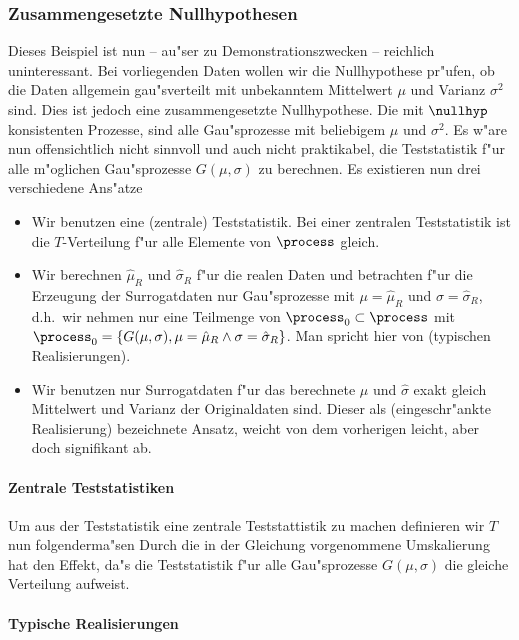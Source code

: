 \subsubsection{Zusammengesetzte Nullhypothesen}
Dieses Beispiel ist nun -- au"ser zu Demonstrationszwecken -- reichlich uninteressant. Bei
vorliegenden Daten wollen wir die Nullhypothese pr"ufen, ob die Daten allgemein
gau"sverteilt mit unbekanntem Mittelwert $\mu$ und Varianz $\sigma^2$ sind. Dies ist
jedoch eine zusammengesetzte Nullhypothese. Die mit $\nullhyp$ konsistenten Prozesse, sind
alle Gau"sprozesse mit beliebigem $\mu$ und $\sigma^2$. Es w"are nun offensichtlich nicht
sinnvoll und auch nicht praktikabel, die Teststatistik  f"ur alle
m"oglichen Gau"sprozesse $G(\mu,\sigma)$ zu berechnen. Es existieren nun drei verschiedene
Ans"atze
\begin{itemize}
\item Wir benutzen eine \begriff(zentrale) Teststatistik. Bei einer zentralen
  Teststatistik ist die $T$-Verteilung f"ur alle Elemente von $\process$ gleich.
\item Wir berechnen $\hat\mu_R$ und $\hat\sigma_R$ f"ur die realen Daten und betrachten f"ur die
  Erzeugung der Surrogatdaten nur Gau"sprozesse mit $\mu=\hat\mu_R$ und $\sigma=\hat\sigma_R$,
  d.h.\ wir nehmen nur eine Teilmenge von $\process_0\subset\process$ mit
  $\process_0=\{G(\mu,\sigma),\mu=\hat\mu_R\land\sigma=\hat\sigma_R\}$. Man spricht hier von \begriff(typischen
  Realisierungen).
\item Wir benutzen nur Surrogatdaten f"ur das berechnete $\hat\mu$ und $\hat\sigma$ exakt gleich
  Mittelwert und Varianz der Originaldaten sind. Dieser als \begriff(eingeschr"ankte
  Realisierung) bezeichnete Ansatz, weicht von dem vorherigen leicht, aber doch
  signifikant ab.
\end{itemize}

\paragraph{Zentrale Teststatistiken}
Um aus der Teststatistik  eine zentrale Teststattistik zu machen definieren wir $T$
 nun folgenderma"sen
Durch die in der Gleichung vorgenommene Umskalierung hat den Effekt, da"s die Teststatistik
f"ur alle Gau"sprozesse $G(\mu,\sigma)$ die gleiche Verteilung aufweist. 


\paragraph{Typische Realisierungen}


